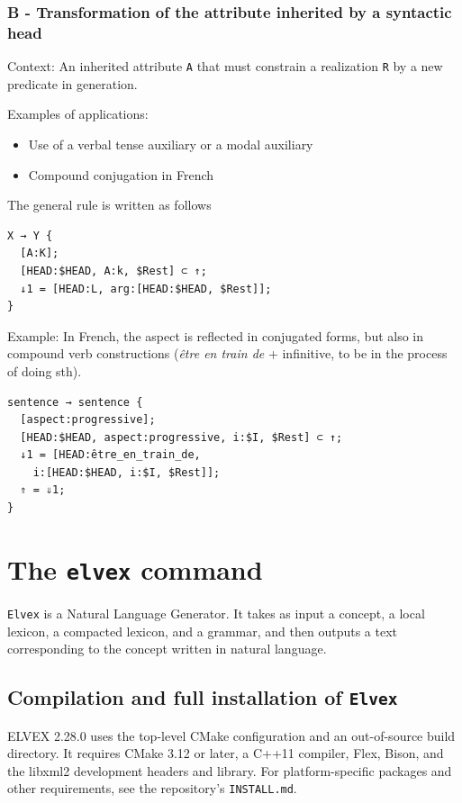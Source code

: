 \documentclass[11pt]{article}
\begin{document}
\subsubsection*{B - Transformation of the attribute inherited by a syntactic head}

Context:
An inherited attribute \texttt{A} that must constrain a realization
\texttt{R} by a new predicate in generation.

Examples of applications:
\begin{itemize}
	\item Use of a verbal tense auxiliary or a modal auxiliary
	\item Compound conjugation in French
\end{itemize}

The general rule is written as follows

\begin{lstlisting}
X → Y {
  [A:K];
  [HEAD:$HEAD, A:k, $Rest] ⊂ ↑;
  ↓1 = [HEAD:L, arg:[HEAD:$HEAD, $Rest]];
}

\end{lstlisting}

Example:
In French, the aspect is reflected in conjugated forms, but also in
compound verb constructions (\textit{être en train de} + infinitive, to be in the
process of doing sth).

\begin{lstlisting}
sentence → sentence {
  [aspect:progressive];
  [HEAD:$HEAD, aspect:progressive, i:$I, $Rest] ⊂ ↑;
  ↓1 = [HEAD:être_en_train_de, 
	i:[HEAD:$HEAD, i:$I, $Rest]];
  ⇑ = ⇓1;
}
\end{lstlisting}

\section{The \texttt{elvex} command}

\texttt{Elvex} is a Natural Language Generator. It takes as input a
concept, a local lexicon, a compacted lexicon, and a grammar, and then
outputs a text corresponding to the concept written in natural language.

\subsection*{Compilation and full installation of \texttt{Elvex}}

ELVEX 2.28.0 uses the top-level CMake configuration and an out-of-source
build directory. It requires CMake 3.12 or later, a C++11 compiler, Flex,
Bison, and the libxml2 development headers and library. For platform-specific
packages and other requirements, see the repository's \texttt{INSTALL.md}.
\end{document}
